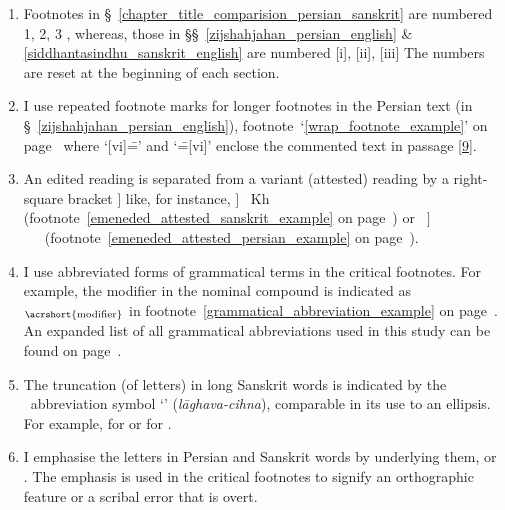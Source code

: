 \begin{enumerate}[topsep=0pt]
    \item Footnotes in \S~\ref{chapter_title_comparision_persian_sanskrit} are numbered 1, 2, 3 \etcp, whereas, those in \S\S~\ref{zijshahjahan_persian_english} \& \ref{siddhantasindhu_sanskrit_english} are numbered [i], [ii], [iii] \etc The numbers are reset at the beginning of each section. 
    \item I use repeated footnote marks for longer footnotes in the Persian text (in \S~\ref{zijshahjahan_persian_english}), \eg footnote~`\ref{wrap_footnote_example}' on page~\pageref{wrap_footnote_example} where `[vi]\==' and `\==[vi]' enclose the commented text in passage [\hyperlink{Ppass9}{9}].   
    \item An edited reading is separated from a variant (attested) reading by a right-square bracket {$\Big]$} like, for instance,  {$\Big ]$} ~Kh (footnote~\ref{emeneded_attested_sanskrit_example} on page~\pageref{emeneded_attested_sanskrit_example}) or ~{$\Big ]$}~~\SjB\ (footnote~\ref{emeneded_attested_persian_example} on page~\pageref{emeneded_attested_persian_example}).
    \item I use abbreviated forms of grammatical terms in the critical footnotes. For example, the \acrfull{modifier}  in the nominal compound  is indicated as \,$_\text{\acrshort{modifier}}$ in footnote~\ref{grammatical_abbreviation_example} on page~\pageref{grammatical_abbreviation_example}. An expanded list of all grammatical abbreviations used in this study can be found on page~\pageref{acronym}.  
    \item The truncation (of letters) in long Sanskrit words is indicated by the \Nagari\ abbreviation symbol `\tsans{\selip}' (\textit{lāghava-cihna}), comparable in its use to an ellipsis. For example,  for   or  for . 
    \item I emphasise the letters in Persian and Sanskrit words by underlying them, \eg {} or . The emphasis is used in the critical footnotes to signify an orthographic feature or a scribal error that is overt.
\end{enumerate}

